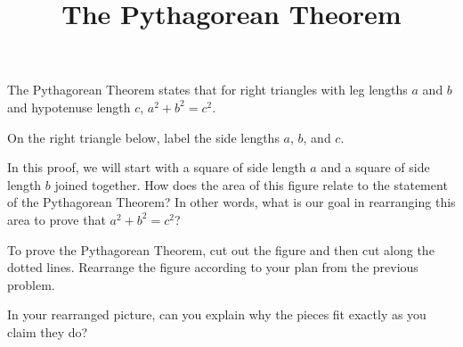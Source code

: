 \documentclass[nooutcomes,noauthor, handout]{ximera}
\title{The Pythagorean Theorem}
\begin{document}
\begin{abstract}
\end{abstract}

\maketitle

The Pythagorean Theorem states that for right triangles with leg lengths $a$ and $b$ and hypotenuse length $c$, $a^2 + b^2 = c^2$.
\begin{problem}
On the right triangle below, label the side lengths $a$, $b$, and $c$.
\begin{image}
\end{image}
\end{problem} \vfill

\begin{problem}
In this proof, we will start with a square of side length $a$ and a square of side length $b$ joined together. How does the area of this figure relate to the statement of the Pythagorean Theorem? In other words, what is our goal in rearranging this area to prove that $a^2 + b^2 = c^2$?
\begin{image}
\end{image}
\end{problem} \vfill


\newpage
\begin{problem} 
To prove the Pythagorean Theorem, cut out the figure and then cut along the dotted lines. Rearrange the figure according to your plan from the previous problem.
\begin{image}
\end{image}
\end{problem}

\begin{problem}
In your rearranged picture, can you explain why the pieces fit exactly as you claim they do?
\end{problem}
\end{document}
